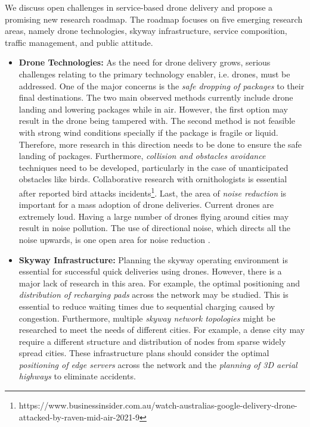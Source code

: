 \documentclass[conference]{IEEEtran}
\begin{document}
We discuss open challenges in service-based drone delivery and propose a promising new research roadmap. The roadmap focuses on five emerging research areas, namely  drone technologies, skyway infrastructure, service composition, traffic management, and public attitude.

\begin{itemize}
    \item \textbf{Drone Technologies:} 
    As the need for drone delivery grows, serious challenges relating to the primary technology enabler, i.e. drones, must be addressed. One of the major concerns is the \textit{safe dropping of packages} to their final destinations. The two main observed methods currently include drone landing and lowering packages while in air. However, the first option may result in the drone being tampered with. The second method is not feasible with strong wind conditions specially if the package is fragile or liquid. Therefore, more research in this direction needs to be done to ensure the safe landing of packages. Furthermore, \textit{collision and obstacles avoidance} techniques need to be developed, particularly in the case of unanticipated obstacles like birds. Collaborative research with ornithologists is essential after reported bird attacks incidents\footnote{https://www.businessinsider.com.au/watch-australias-google-delivery-drone-attacked-by-raven-mid-air-2021-9}. Last, the area of \textit{noise reduction} is important for a mass adoption of drone deliveries. Current drones are extremely loud. Having a large number of drones flying around cities may result in noise pollution. The use of directional noise, which directs all the noise upwards, is one open area for noise reduction \cite{wu2019novel}.
    \item \textbf{Skyway Infrastructure:}
    Planning the skyway operating environment is essential for successful quick deliveries using drones. However, there is a major lack of research in this area. For example, the optimal positioning and \textit{distribution of recharging pads} across the network may be studied. This is essential to reduce waiting times due to sequential charging caused by congestion. Furthermore, multiple \textit{skyway network topologies} might be researched to meet the needs of different cities. For example, a dense city may require a different structure and distribution of nodes from sparse widely spread cities. These infrastructure plans should consider the optimal \textit{positioning of edge servers} across the network and the \textit{planning of 3D aerial highways} to eliminate accidents.

\end{itemize}
\end{document}
